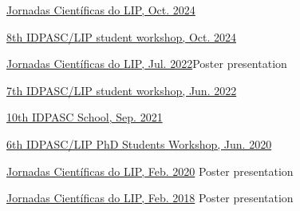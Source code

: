 \begin{cventries}
    

{\href{https://indico.lip.pt/event/1744/}{Jornadas Científicas do LIP, Oct. 2024}}{}

{\href{https://indico.lip.pt/event/1745/}{8th IDPASC/LIP student workshop, Oct. 2024}}{}

{\href{https://indico.lip.pt/event/1183/}{Jornadas Científicas do LIP, Jul. 2022}}{Poster presentation}

{\href{https://indico.lip.pt/event/1245/}{7th IDPASC/LIP student workshop, Jun. 2022}}{}

{}{\href{https://indico.lip.pt/event/643}{10th IDPASC School, Sep. 2021}}{}

{}{\href{https://indico.lip.pt/event/699/}{6th IDPASC/LIP PhD Students Workshop, Jun. 2020}}
{}

{}{\href{https://indico.lip.pt/event/650/}{Jornadas Científicas do LIP, Feb. 2020}}
{Poster presentation}

{}{\href{https://indico.lip.pt/event/359/}{Jornadas Científicas do LIP, Feb. 2018}}
{Poster presentation} 

\end{cventries}